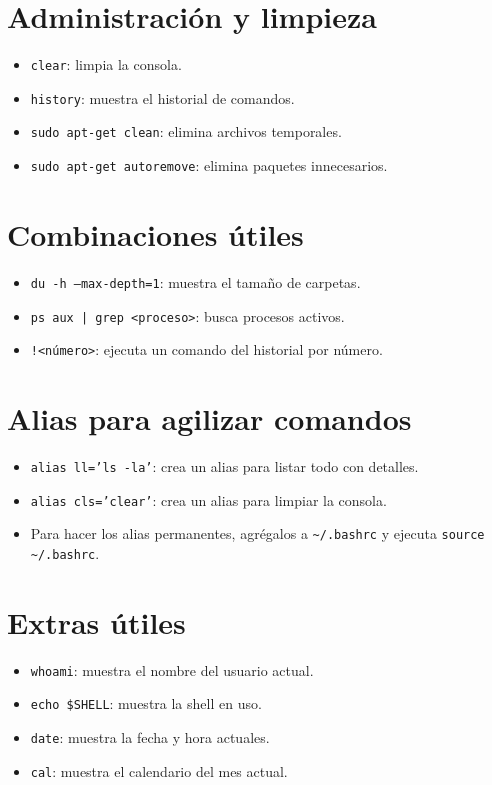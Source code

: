 \documentclass{article}
\begin{document}
\section{Administración y limpieza}
\begin{itemize}
    \item \texttt{clear}: limpia la consola.
    \item \texttt{history}: muestra el historial de comandos.
    \item \texttt{sudo apt-get clean}: elimina archivos temporales.
    \item \texttt{sudo apt-get autoremove}: elimina paquetes innecesarios.
\end{itemize}

\section{Combinaciones útiles}
\begin{itemize}
    \item \texttt{du -h --max-depth=1}: muestra el tamaño de carpetas.
    \item \texttt{ps aux | grep <proceso>}: busca procesos activos.
    \item \texttt{!<número>}: ejecuta un comando del historial por número.
\end{itemize}

\section{Alias para agilizar comandos}
\begin{itemize}
    \item \texttt{alias ll='ls -la'}: crea un alias para listar todo con detalles.
    \item \texttt{alias cls='clear'}: crea un alias para limpiar la consola.
    \item Para hacer los alias permanentes, agrégalos a \texttt{\textasciitilde/.bashrc} y ejecuta \texttt{source \textasciitilde/.bashrc}.
\end{itemize}

\section{Extras útiles}
\begin{itemize}
    \item \texttt{whoami}: muestra el nombre del usuario actual.
    \item \texttt{echo \$SHELL}: muestra la shell en uso.
    \item \texttt{date}: muestra la fecha y hora actuales.
    \item \texttt{cal}: muestra el calendario del mes actual.
\end{itemize}
\end{document}
